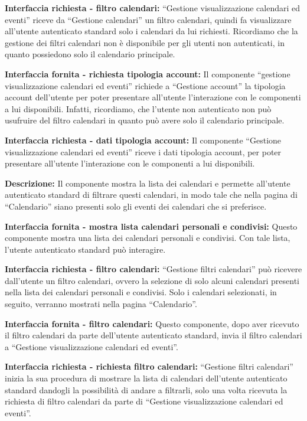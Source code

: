 \begin{listaPersonale}[]{}
    \textbf{Interfaccia richiesta - filtro calendari:} “Gestione visualizzazione calendari ed eventi” riceve da “Gestione calendari” un filtro calendari, quindi fa visualizzare all'utente autenticato standard solo i calendari da lui richiesti. Ricordiamo che la gestione dei filtri calendari non è disponibile per gli utenti non autenticati, in quanto possiedono solo il calendario principale.

    \textbf{Interfaccia fornita - richiesta tipologia account:} Il componente “gestione visualizzazione calendari ed eventi” richiede a “Gestione account”  la tipologia account dell'utente per poter presentare all'utente l'interazione con le componenti a lui disponibili. Infatti, ricordiamo, che l'utente non autenticato non può usufruire del filtro calendari in quanto può avere solo il calendario principale.

    \textbf{Interfaccia richiesta - dati tipologia account:} Il componente “Gestione visualizzazione calendari ed eventi” riceve i dati tipologia account, per poter presentare all'utente l'interazione con le componenti a lui disponibili.



    \textbf{Descrizione:} Il componente mostra la lista dei calendari e permette all'utente autenticato standard di filtrare questi calendari, in modo tale che nella pagina di “Calendario” siano presenti solo gli eventi dei calendari che si preferisce.

    \textbf{Interfaccia fornita - mostra lista calendari personali e condivisi:} Questo componente mostra una lista dei calendari personali e condivisi. Con tale lista, l'utente autenticato standard può interagire.

    \textbf{Interfaccia richiesta - filtro calendari:} “Gestione filtri calendari” può ricevere dall'utente un filtro calendari, ovvero la selezione di solo alcuni calendari presenti nella lista dei calendari personali e condivisi. Solo i calendari selezionati, in seguito, verranno mostrati nella pagina “Calendario”.

    \textbf{Interfaccia fornita - filtro calendari:} Questo componente, dopo aver ricevuto il filtro calendari da parte dell'utente autenticato standard, invia il filtro calendari a “Gestione visualizzazione calendari ed eventi”.


    \textbf{Interfaccia richiesta - richiesta filtro calendari:} “Gestione filtri calendari” inizia la sua procedura di mostrare la lista di calendari dell'utente autenticato standard dandogli la possibilità di andare a filtrarli, solo una volta ricevuta la richiesta di filtro calendari da parte di “Gestione visualizzazione calendari ed eventi”.



\end{listaPersonale}
